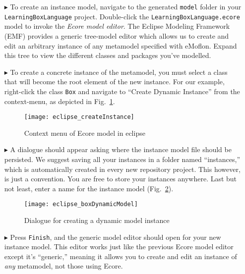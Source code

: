 \begin{itemize}

\item[$\blacktriangleright$] To create an instance model, navigate to the generated \texttt{model} folder in your \texttt{LearningBoxLanguage} project.
Double-click the \texttt{LearningBoxLa\-nguage.ecore} model to invoke  the \emph{Ecore model editor}. The Eclipse Modeling Framework (EMF) provides a generic
tree-model editor which allows us to create and edit an arbitrary instance of any metamodel specified with eMoflon. Expand this tree to view the different
classes and packages you've modelled.

\item[$\blacktriangleright$] To create a concrete instance of the metamodel, you must select a class that will become the root element of the new instance.
For our example, right-click the class \texttt{Box} and navigate to ``Create Dynamic Instance'' from the context-menu, as depicted in
Fig.~\ref{fig:context_menu}.

\begin{figure}[htbp]
	\centering
  \texttt{[image: eclipse\_createInstance]}
	\caption{Context menu of Ecore model in eclipse}
	\label{fig:context_menu}
\end{figure}

\clearpage

\item[$\blacktriangleright$] A dialogue should appear asking where the instance model file should be persisted. We suggest saving all your instances in a folder
named ``instances,'' which is automatically created in every new repository project. This however, is just a convention. You are free to store your
instances anywhere. Last but not least, enter a name for the instance model (Fig.~\ref{fig:store_dynamic_instance}).

\begin{figure}[htbp]
	\centering
  \texttt{[image: eclipse\_boxDynamicModel]}
	\caption{Dialogue for creating a dynamic model instance}
	\label{fig:store_dynamic_instance}
\end{figure}

\item[$\blacktriangleright$] Press \texttt{Finish}, and the generic model editor should open for your new instance model. This editor works just like the
previous Ecore model editor except it's ``generic,'' meaning it allows you to create and edit an instance of \emph{any} metamodel, not those using Ecore.


\end{itemize}
